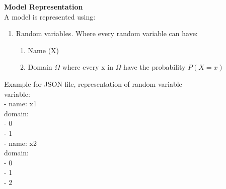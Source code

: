     \textbf{Model Representation}\\
    A model is represented using:
    \vspace{0.1cm}
    \begin{enumerate}
        \item Random variables. Where every random variable can have:
        \begin{enumerate}
            \item Name (X)
            \item Domain $\Omega$ where every x in $\Omega$ have the probability $P(X=x)$
        \end{enumerate}
    \end{enumerate}
    Example for JSON file, representation of random variable\\
    variable:\\
            \-\quad - name: x1\\
            \-\quad\quad   domain:\\
            \-\quad\quad - 0\\
            \-\quad\quad - 1\\
            \-\quad - name: x2\\
            \-\quad\quad   domain:\\
            \-\quad\quad - 0\\
            \-\quad\quad - 1\\
            \-\quad\quad - 2\\
    
